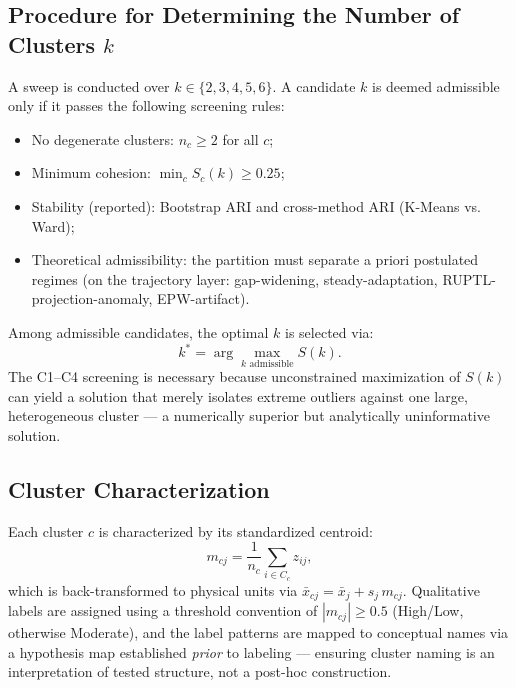 \documentclass[11pt,a4paper]{article}
\begin{document}
\subsection{Procedure for Determining the Number of Clusters $k$}
A sweep is conducted over $k \in \{2,3,4,5,6\}$. A candidate $k$ is deemed admissible only if it passes the following screening rules:
\begin{itemize}[nosep]
\item[\textbf{C1}] No degenerate clusters: $n_c \ge 2$ for all $c$;
\item[\textbf{C2}] Minimum cohesion: $\min_c S_c(k) \ge 0.25$;
\item[\textbf{C3}] Stability (reported): Bootstrap ARI and cross-method ARI (K-Means vs. Ward);
\item[\textbf{C4}] Theoretical admissibility: the partition must separate a priori postulated regimes (on the trajectory layer: gap-widening, steady-adaptation, RUPTL-projection-anomaly, EPW-artifact).
\end{itemize}
Among admissible candidates, the optimal $k$ is selected via:
\begin{equation}
k^\ast = \arg\max_{k \text{ admissible}} S(k).
\label{eq:kstar}
\end{equation}
The C1--C4 screening is necessary because unconstrained maximization of $S(k)$ can yield a solution that merely isolates extreme outliers against one large, heterogeneous cluster --- a numerically superior but analytically uninformative solution.

\subsection{Cluster Characterization}
Each cluster $c$ is characterized by its standardized centroid:
\begin{equation}
m_{cj} = \frac{1}{n_c}\sum_{i \in C_c} z_{ij},
\label{eq:centroid}
\end{equation}
which is back-transformed to physical units via $\bar{x}_{cj} = \bar{x}_j + s_j\,m_{cj}$. Qualitative labels are assigned using a threshold convention of $|m_{cj}| \ge 0.5$ (High/Low, otherwise Moderate), and the label patterns are mapped to conceptual names via a hypothesis map established \emph{prior} to labeling --- ensuring cluster naming is an interpretation of tested structure, not a post-hoc construction.

\end{document}
